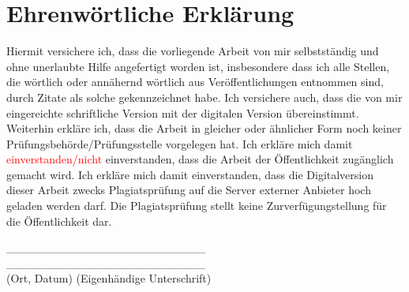 \newpage
{} %

\section*{Ehrenwörtliche Erklärung}
Hiermit versichere ich, dass die vorliegende Arbeit von mir selbstständig und ohne unerlaubte Hilfe angefertigt worden ist, insbesondere dass ich alle Stellen, die wörtlich oder annähernd wörtlich aus Veröffentlichungen entnommen sind, durch Zitate als solche gekennzeichnet habe. Ich versichere auch, dass die von mir eingereichte schriftliche Version mit der digitalen Version übereinstimmt. Weiterhin erkläre ich, dass die Arbeit in gleicher oder ähnlicher Form noch keiner Prüfungsbehörde/Prüfungsstelle vorgelegen hat. Ich erkläre mich damit \textcolor{red}{einverstanden/nicht} einverstanden, dass die Arbeit der Öffentlichkeit zugänglich gemacht wird. Ich erkläre mich damit einverstanden, dass die Digitalversion dieser Arbeit zwecks Plagiatsprüfung auf die Server externer Anbieter hoch geladen werden darf. Die Plagiatsprüfung stellt keine Zurverfügungstellung für die Öffentlichkeit dar.

\par\medskip
\par\medskip

\_\_\_\_\_\_\_\_\_\_\_\_\_\_\_\_\_\_\_\_\_\_\_\_ \hspace{1.5cm} \_\_\_\_\_\_\_\_\_\_\_\_\_\_\_\_\_\_\_\_\_\_\_\_ \\
(Ort, Datum)\hspace{4.5cm}
(Eigenhändige Unterschrift)
